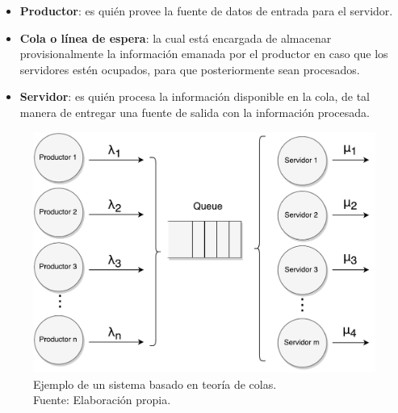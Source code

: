 \begin{itemize}
	\item \textbf{Productor}: es qui\'en provee la fuente de datos de entrada para el servidor.
	\item \textbf{Cola o l\'inea de espera}: la cual est\'a encargada de almacenar provisionalmente la informaci\'on emanada por el productor en caso que los servidores est\'en ocupados, para que posteriormente sean procesados.
	\item \textbf{Servidor}: es qui\'en procesa la informaci\'on disponible en la cola, de tal manera de entregar una fuente de salida con la informaci\'on procesada.
\end{itemize}

\begin{figure}[!ht]
	\centering
	\includegraphics[scale=0.6]{images/TeoriaColas.pdf}
	\caption[Ejemplo de un sistema basado en teor\'ia de colas.]{Ejemplo de un sistema basado en teor\'ia de colas.\\Fuente: Elaboraci\'on propia.}
	\label{fig:teoriaColas}
\end{figure}

